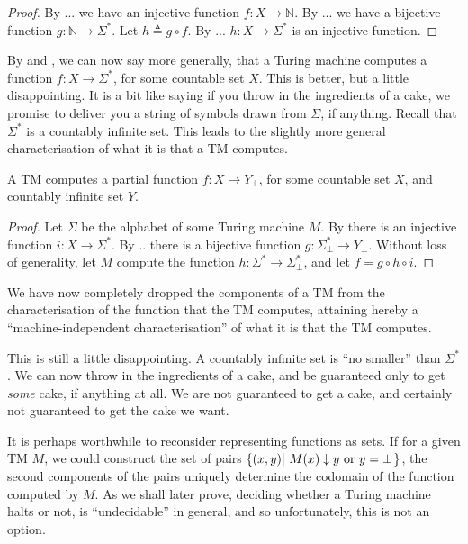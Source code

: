 \begin{proof} By ... we have an injective function $f:X\rightarrow \mathbb{N}$.
By ... we have a bijective function $g:\mathbb{N}\rightarrow\Sigma^*$. Let
$h\triangleq g\circ f$. By ...  $h : X\rightarrow \Sigma^*$ is an injective
function.  \end{proof}

By  and , we can
now say more generally, that a Turing machine computes a function
$f:X\rightarrow \Sigma^*$, for some countable set $X$. This is better, but a
little disappointing. It is a bit like saying if you throw in the ingredients
of a cake, we promise to deliver you a string of symbols drawn from $\Sigma$,
if anything. Recall that $\Sigma^*$ is a countably infinite set. This leads to
the slightly more general characterisation of what it is that a TM computes.

\begin{corollary} A TM computes a partial function $f:X\rightarrow Y_\bot$, for
some countable set $X$, and countably infinite set $Y$. \end{corollary}

\begin{proof} Let $\Sigma$ be the alphabet of some Turing machine $M$. By
 there is an injective function $i : X
\rightarrow \Sigma^*$. By .. there is a bijective function $g : \Sigma^*_\bot
\rightarrow Y_\bot$. Without loss of generality, let $M$ compute the function
$h : \Sigma^* \rightarrow \Sigma^*_\bot$, and let $f = g \circ h \circ i$.
\end{proof} 

\begin{remark} We have now completely dropped the components of a TM from the
characterisation of the function that the TM computes, attaining hereby a
``machine-independent characterisation'' of what it is that the TM computes.
\end{remark}

This is still a little disappointing. A countably infinite set is ``no
smaller'' than $\Sigma^*$. We can now throw in the ingredients of a cake, and
be guaranteed only to get \emph{some} cake, if anything at all. We are not
guaranteed to get a cake, and certainly not guaranteed to get the cake we want.

It is perhaps worthwhile to reconsider representing functions as sets. If for a
given TM $M$, we could construct the set of pairs
$\mathopen{}\left\{{\mathopen{}\left({x,y}\right)\mathclose{}\mathopen{}\left|\ {\text{$M\mathopen{}\left({x}\right)\mathclose{}\downarrow y$ or $y=\bot$}}\right.\mathclose{}}\right\}\mathclose{}$, the second
components of the pairs uniquely determine the codomain of the function
computed by $M$. As we shall later prove, deciding whether a Turing machine
halts or not, is ``undecidable'' in general, and so unfortunately, this is not
an option.


